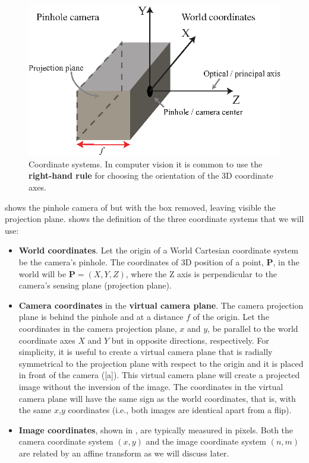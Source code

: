 \begin{figure}[t]
\centerline{
\includegraphics[width=.7\linewidth]{figures/imaging/pinhole_names2.eps}
}
\caption{Coordinate systems. In computer vision it is common to use the {\bf right-hand rule} for choosing the orientation of the 3D coordinate axes.}
\label{fig:pinhole_names}
\end{figure}



\Fig{\ref{fig:pinholeGeometry}} shows the pinhole camera of \fig{\ref{fig:pinhole_names}} but with the box removed, leaving visible the projection plane. \Fig{\ref{fig:pinholeGeometry}} shows the definition of the three coordinate systems that we will use:
\begin{itemize}
    \item {\bf World coordinates}. Let the origin of a World Cartesian coordinate system be the camera's pinhole.
The coordinates of 3D position of a point, $\mathbf{P}$, in the world will be $\mathbf{P} = (X, Y, Z)$, where the Z axis is perpendicular to the
camera's sensing plane (projection plane).
    \item {\bf Camera coordinates} in the {\bf virtual camera plane}. 
    The camera projection plane is behind the pinhole and at a distance $f$ of the origin. Let the coordinates in the camera projection plane, $x$ and $y$, be parallel to the world coordinate axes $X$ and $Y$ but in opposite directions, respectively. For simplicity, it is useful to create a virtual camera plane that is radially symmetrical to the projection plane with respect to the origin and it is placed in front of the camera (\fig{\ref{fig:pinholeGeometry}}[a]). This virtual camera plane will create a projected image without the inversion of the image.  The coordinates in the virtual camera plane will have the same sign as the world coordinates, that is, with the same $x$,$y$ coordinates (i.e., both images are identical apart from a flip).
    \item {\bf Image coordinates}, shown in , are typically measured in pixels. Both the camera coordinate system $(x,y)$ and the image coordinate system $(n,m)$ are related by an affine transform as we will discuss later.
\end{itemize}


